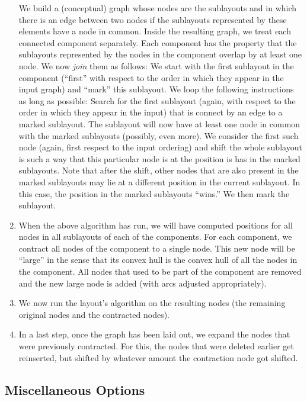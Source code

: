 \begin{enumerate}
  We build a (conceptual) graph whose nodes are the sublayouts and in
  which there is an edge between two nodes if the sublayouts
  represented by these elements have a node in common.
  Inside the resulting graph, we treat each connected component
  separately. Each component has the property that the sublayouts
  represented by the nodes in the component overlap by at least one
  node. We now \emph{join} them as follows: We start with the first
  sublayout in the component (``first'' with respect to the order in
  which they appear in the input graph) and ``mark'' this
  sublayout. We loop the following instructions as long as possible:
  Search for the first sublayout (again, with respect to the order in
  which they appear in the input) that is connect by an edge to a
  marked sublayout. The sublayout will now have at least one node in
  common with the marked sublayouts (possibly, even more). We
  consider the first such node (again, first respect to the input
  ordering) and shift the whole sublayout is such a way that this
  particular node is at the position is has in the marked
  sublayouts. Note that after the shift, other nodes that are also
  present in the marked sublayouts may lie at a different position in
  the current sublayout. In this case, the position in the marked
  sublayouts ``wins.'' We then mark the sublayout.
\item When the above algorithm has run, we will have computed
  positions for all nodes in all sublayouts of each of the
  components. For each component, we contract all
  nodes of the component to a single node. This new 
  node will be ``large'' in the sense that its convex hull is the
  convex hull of all the nodes in the component. All nodes that used
  to be part of the component are removed and the new large node is
  added (with arcs adjusted appropriately). 
\item We now run the layout's algorithm on the resulting nodes
  (the remaining original nodes and the contracted nodes).
\item In a last step, once the graph has been laid out, we expand the
  nodes that were previously contracted. For this, the 
  nodes that were deleted earlier get reinserted, but shifted by
  whatever amount the contraction node got shifted.
\end{enumerate}


\subsection{Miscellaneous Options}


\endinput

